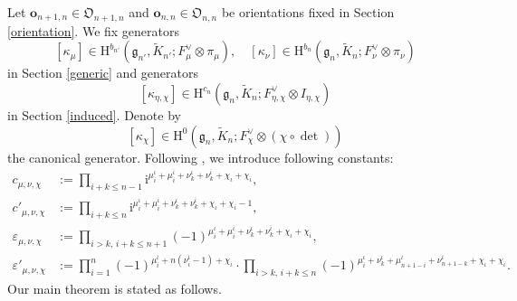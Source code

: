 \documentclass[12pt, a4paper]{amsart}
\newcommand{\RH}{{\mathrm {H}}}
\theoremstyle{Theorem}
\theoremstyle{Theorem}
\theoremstyle{Theorem}
\theoremstyle{Theorem}
\theoremstyle{Plain}
\theoremstyle{Definition}
\begin{document}
	Let $\mathbf{o}_{n+1,n}\in\mathfrak{O}_{n+1,n}$ and $\mathbf{o}_{n,n}\in\mathfrak{O}_{n,n}$ be orientations fixed in Section \ref{orientation}. We fix generators
	\[
	[\kappa_{\mu}]\in\RH^{b_{n'}}\left(\mathfrak{g}_{n'},\widetilde{K}_{n'};F_{\mu}^{\vee}\otimes\pi_{\mu}\right),\quad
	[\kappa_{\nu}]\in\RH^{b_{n}}\left(\mathfrak{g}_{n},\widetilde{K}_{n};F_{\nu}^{\vee}\otimes\pi_{\nu}\right)
	\]
	in Section \ref{generic} and generators
	\[
	[\kappa_{\eta,\chi}]\in\RH^{c_n}\left(\mathfrak{g}_n,\widetilde{K}_n;F_{\eta,\chi}^{\vee}\otimes I_{\eta,\chi}\right)
	\]
	in Section \ref{induced}. Denote by
	\[
	[\kappa_{\chi}]\in\RH^0\left(\mathfrak{g}_{n},\widetilde{K}_{n};F_{\chi}^{\vee}\otimes(\chi\circ\det)\right)
	\]
	the canonical generator. Following \cite[(24)]{JLSa}, we introduce following constants:
	\begin{equation}\label{constants}
		\begin{aligned}
			c_{\mu,\nu,\chi}&:=\prod_{i+k\leq n-1}\mathrm{i}^{\mu_i^{\iota}+\mu_i^{\overline{\iota}}+\nu_k^{\iota}+\nu_k^{\overline{\iota}}+\chi_{\iota}+\chi_{\overline{\iota}}},\\
			c'_{\mu,\nu,\chi}&:=\prod_{i+k\leq n}\mathrm{i}^{\mu_i^{\iota}+\mu_i^{\overline{\iota}}+\nu_k^{\iota}+\nu_k^{\overline{\iota}}+\chi_{\iota}+\chi_{\overline{\iota}}-1},\\
			\varepsilon_{\mu,\nu,\chi}&:=\prod_{i>k,\, i+k\leq n+1}(-1)^{\mu_i^{\iota}+\mu_i^{\overline{\iota}}+\nu_k^{\iota}+\nu_k^{\overline{\iota}}+\chi_{\iota}+\chi_{\overline{\iota}}},\\
			\varepsilon'_{\mu,\nu,\chi}&:=\prod_{i=1}^n(-1)^{\mu_i^{\overline{\iota}}+n(\nu_i^{\overline{\iota}}-1)+\chi_{\overline{\iota}}}\cdot\prod_{i>k,\,i+k\leq n}(-1)^{\mu_i^{\iota}+\nu_k^{\iota}+\mu_{n+1-i}^{\overline{\iota}}+\nu_{n+1-k}^{\overline{\iota}}+\chi_{\iota}+\chi_{\overline{\iota}}}.
		\end{aligned}
	\end{equation}
	Our main theorem is stated as follows. %
	
\end{document}
